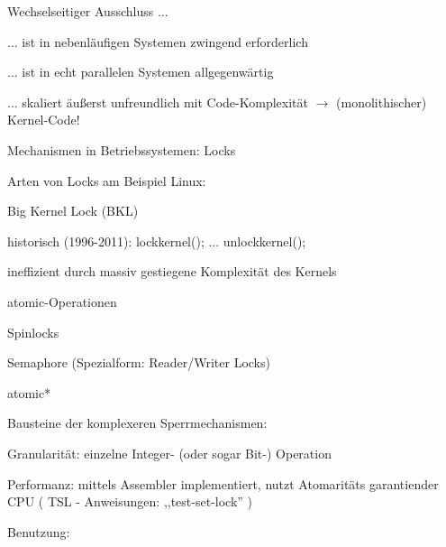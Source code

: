 \documentclass[a4paper]{article}
\begin{document}
\begin{multicols}{3}
    \begin{itemize*}
        \item Wechselseitiger Ausschluss ...
        \begin{itemize*}
            \item ... ist in nebenläufigen Systemen zwingend erforderlich
            \item ... ist in echt parallelen Systemen allgegenwärtig
            \item ... skaliert äußerst unfreundlich mit Code-Komplexität $\rightarrow$ (monolithischer) Kernel-Code!
        \end{itemize*}
        \item Mechanismen in Betriebssystemen: Locks
        \item Arten von Locks am Beispiel Linux:
        \begin{itemize*}
            \item Big Kernel Lock (BKL) \begin{itemize*} \item historisch (1996-2011): lockkernel(); ... unlockkernel(); \item ineffizient durch massiv gestiegene Komplexität des Kernels \end{itemize*}
            \item atomic-Operationen
            \item Spinlocks
            \item Semaphore (Spezialform: Reader/Writer Locks)
        \end{itemize*}
    \end{itemize*}

    atomic*

    \begin{itemize*}
        \item Bausteine der komplexeren Sperrmechanismen:
        \begin{itemize*}
            \item Granularität: einzelne Integer- (oder sogar Bit-) Operation
            \item Performanz: mittels Assembler implementiert, nutzt Atomaritäts garantiender CPU ( TSL - Anweisungen: ,,test-set-lock'' )
        \end{itemize*}
        \item Benutzung:


\end{itemize*}
\end{multicols}
\end{document}
